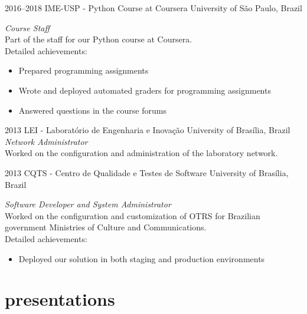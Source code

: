 \documentclass[print]{friggeri-cv}
\begin{document}
\begin{entrylist}

\entry
{2016--2018}
{IME-USP - Python Course at Coursera}
{University of São Paulo, Brazil}
{\emph{Course Staff} \\
Part of the staff for our Python course at Coursera. \\
Detailed achievements:
\begin{itemize}
  \item Prepared programming assignments
  \item Wrote and deployed automated graders for programming assignments
  \item Answered questions in the course forums
\end{itemize}}

\entry
{2013}
{LEI - Laboratório de Engenharia e Inovação}
{University of Brasília, Brazil}
{\emph{Network Administrator} \\
  Worked on the configuration and administration of the laboratory network. \\
}

\end{entrylist}
\begin{entrylist}


\entry
{2013}
{CQTS - Centro de Qualidade e Testes de Software}
{University of Brasília, Brazil}
{\emph{Software Developer and System Administrator} \\
  Worked on the configuration and customization of OTRS for Brazilian
  government Ministries of Culture and Communications. \\
Detailed achievements:
\begin{itemize}
  \item Deployed our solution in both staging and production environments
\end{itemize}}

\end{entrylist}

\section{presentations}
\end{document}
